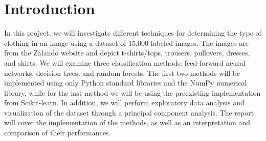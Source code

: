 \section{Introduction}
In this project, we will investigate different techniques for determining the type of clothing in an image using a dataset of 15,000 labeled images.
The images are from the Zalando website and depict t-shirts/tops, trousers, pullovers, dresses, and shirts.
We will examine three classification methods: feed-forward neural networks, decision trees, and random forests.
The first two methods will be implemented using only Python standard libraries and the NumPy numerical library, while for the last method we will be using the preexisting implementation from Scikit-learn.
In addition, we will perform exploratory data analysis and visualization of the dataset through a principal component analysis.
The report will cover the \cite{johnson_how_2002} implementation of the methods, as well as an interpretation and comparison of their performances.